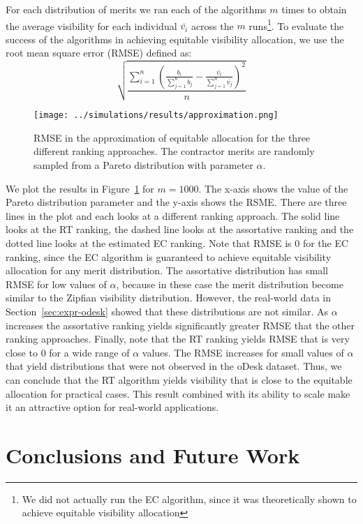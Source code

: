 \documentclass[prodmode,acmec]{acmsmall}
\begin{document}
For each distribution of merits we ran each of the algorithms $m$
times to obtain the average visibility for each individual $\bar{v_i}$
across the $m$ runs\footnote{We did not actually run the EC algorithm,
  since it was theoretically shown to achieve equitable visibility
  allocation}. To evaluate the success of the algorithms in achieving
equitable visibility allocation, we use the root mean square error
(RMSE) defined as:
\[
\sqrt{\frac{\sum_{i=1}^n\left(\frac{b_i}{\sum_{j=1}^n
        b_j}-\frac{\bar{v_i}}{\sum_{j=1}^n \bar{v_j}}\right)^2}{n}}
\]
\begin{figure}[t]
  \centering
  \texttt{[image: ../simulations/results/approximation.png]}
  \caption{RMSE in the approximation of equitable allocation for the
    three different ranking approaches. The contractor merits are
    randomly sampled from a Pareto distribution with parameter $\alpha$.}
  \label{fig:approximation}
\end{figure} 
We plot the results in Figure~\ref{fig:approximation} for
$m=1000$. The x-axis shows the value of the Pareto distribution
parameter and the y-axis shows the RSME. There are three lines in the
plot and each looks at a different ranking approach. The solid line
looks at the RT ranking, the dashed line looks at the assortative
ranking and the dotted line looks at the estimated EC ranking. Note
that RMSE is 0 for the EC ranking, since the EC algorithm is
guaranteed to achieve equitable visibility allocation for any merit
distribution. The assortative distribution has small RMSE for low
values of $\alpha$, because in these case the merit distribution
become similar to the Zipfian visibility distribution. However, the
real-world data in Section~\ref{sec:expr-odesk} showed that these
distributions are not similar. As $\alpha$ increases the assortative
ranking yields significantly greater RMSE that the other ranking
approaches. Finally, note that the RT ranking yields RMSE that is very
close to $0$ for a wide range of $\alpha$ values. The RMSE increases
for small values of $\alpha$ that yield distributions that were not
observed in the oDesk dataset. Thus, we can conclude that the RT
algorithm yields visibility that is close to the equitable allocation
for practical cases. This result combined with its ability to scale
make it an attractive option for real-world applications.


\section{Conclusions and Future Work} 
\end{document}
